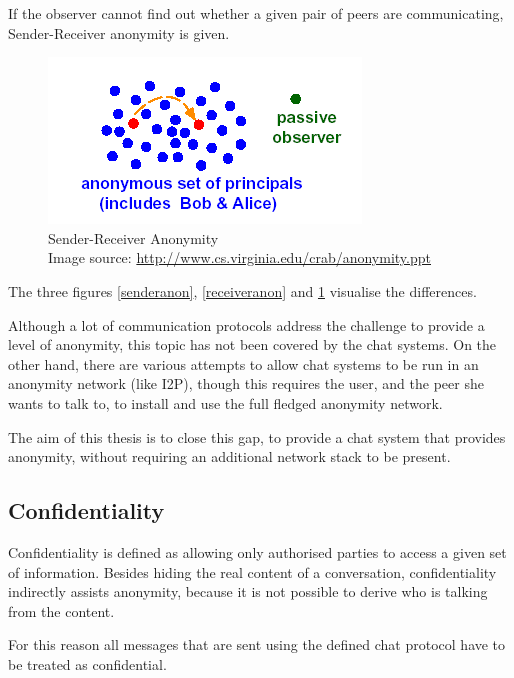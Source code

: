 If the observer cannot find out whether a given pair of peers
are communicating, Sender-Receiver anonymity is given.
\begin{figure}
    \centering
    \caption[Sender-Receiver Anonymity]{Sender-Receiver Anonymity\\Image source: \protect\url{http://www.cs.virginia.edu/crab/anonymity.ppt}}
    \label{senderreceiveranon}
    \includegraphics[scale=0.8]{sender-receiver-anon.png}
\end{figure}
The three figures \ref{senderanon}, \ref{receiveranon} and
\ref{senderreceiveranon} visualise the differences.

Although a lot of communication protocols address the challenge
to provide a level of anonymity, this topic has not been covered
by the chat systems. On the other hand, there are various attempts
to allow chat systems to be run in an anonymity network (like I2P), 
though this requires the user, and the peer she wants to talk to,
to install and use the full fledged anonymity network.

The aim of this thesis is to close this gap, to provide a chat system
that provides anonymity, without requiring an additional network stack
to be present.
\subsection{Confidentiality}
Confidentiality is defined as allowing only authorised parties to access
a given set of information. Besides hiding the real content of a conversation,
confidentiality indirectly assists anonymity, because it is not possible to
derive who is talking from the content.

For this reason all messages that are sent using the defined chat protocol
have to be treated as confidential.
% 
